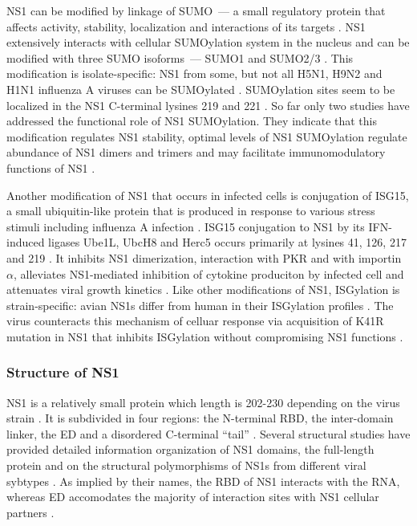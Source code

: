 		\gls{NS1} can be modified by linkage of \gls{SUMO}~--- a small regulatory protein that affects activity, stability, localization and interactions of its targets \parencite{Johnson2004, Pal2010a}. \gls{NS1} extensively interacts with cellular \gls{SUMO}ylation system in the nucleus and can be modified with three \gls{SUMO} isoforms~--- \gls{SUMO}1 and \gls{SUMO}2/3 \parencite{Pal2011, Santos2013a}. This modification is isolate-specific: \gls{NS1} from some, but not all H5N1, H9N2 and H1N1 influenza A viruses can be \gls{SUMO}ylated \parencite{Xu2011}. \gls{SUMO}ylation sites seem to be localized in the NS1 C-terminal lysines 219 and 221 \parencite{Xu2011}. So far only two studies have addressed the functional role of \gls{NS1} \gls{SUMO}ylation. They indicate that this modification regulates \gls{NS1} stability, optimal levels of \gls{NS1} \gls{SUMO}ylation regulate abundance of \gls{NS1} dimers and trimers and may facilitate immunomodulatory functions of \gls{NS1} \parencite{Xu2011, Santos2013a}. 
		
		Another modification of \gls{NS1} that occurs in infected cells is conjugation of \gls{ISG15}, a small ubiquitin-like protein that is produced in response to various stress stimuli including influenza A infection \parencite{Pitha-Rowe2007, Sadler2008, Hsiang2009}. \gls{ISG15} conjugation to \gls{NS1} by its \gls{IFN}-induced ligases Ube1L, UbcH8 and Herc5 occurs primarily at lysines 41, 126, 217 and 219 \parencite{Zhao2010, Tang2010a}. It inhibits \gls{NS1} dimerization, interaction with \gls{PKR} and with importin $\alpha$, alleviates \gls{NS1}-mediated inhibition of cytokine produciton by infected cell and attenuates viral growth kinetics \parencite{Zhao2010, Tang2010a}. Like other modifications of \gls{NS1}, ISGylation is strain-specific: avian \gls{NS1}s differ from human in their ISGylation profiles \parencite{Tang2010a}. The virus counteracts this mechanism of celluar response via acquisition of K41R mutation in NS1 that inhibits ISGylation without compromising \gls{NS1} functions \parencite{Zhao2013}.
	
		
		\subsubsection{Structure of NS1}
		
		\gls{NS1} is a relatively small protein which length is 202-230 depending on the virus strain \parencite{Hale2008b}. It is subdivided in four regions: the N-terminal \gls{RBD}, the inter-domain linker, the \gls{ED} and a disordered C-terminal ``tail'' \parencite{Hale2014}. Several structural studies have provided detailed information organization of \gls{NS1} domains, the full-length protein and on the structural polymorphisms of \gls{NS1}s from different viral sybtypes \parencite{Chien1997, Liu1997a, Wang1999a, Bornholdt2006, Yin2007a, Hale2008c, Cheng2009, Xia2009, Kerry2011, Carrillo2014}. As implied by their names, the \gls{RBD} of NS1 interacts with the RNA, whereas \gls{ED} accomodates the majority of interaction sites with \gls{NS1} cellular partners \parencite{Hale2008b}.
		
